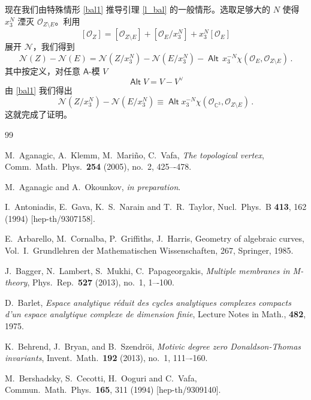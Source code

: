 \documentclass[12pt]{article}
\newcommand{\C}{\mathbb{C}}
\newcommand{\cO}{\mathscr{O}}
\newcommand{\cN}{\mathscr{N}}
\DeclareMathOperator{\Alt}{\textsf{Alt}}
\newcommand{\bA}{\mathsf{A}}
\theoremstyle{definition}
\begin{document}
现在我们由特殊情形 \eqref{bal1} 推导引理 \ref{l_bal} 的一般情形。选取足够大的 $N$ 使得 $x_3^N$ 湮灭 $\cO_{Z\setminus E}$。利用
$$
\left[\cO_{Z}\right] =
\left[\cO_{Z\setminus E}\right] +
\left[\cO_{E}/x_3^N\right] + x_3^N \left[\cO_{E}\right]
$$
展开 $\cN$，我们得到
\begin{equation}
\cN(Z) - \cN(E)  =
  \cN(Z/x_3^N) - \cN(E/x_3^N)
- \Alt \, x_3^{-N} \chi(\cO_E, \cO_{Z\setminus E} ) \,.
\end{equation}
其中按定义，对任意 $\bA$-模 $V$
$$
\Alt V = V - V^{\vee}
$$
由 \eqref{bal1} 我们得出
$$
\cN(Z/x_3^N) - \cN(E/x_3^N)  \equiv \Alt
 x_3^{-N} \chi(\cO_{\C^3}, \cO_{Z\setminus E}) \,.
$$
这就完成了证明。
\begin{thebibliography}{99}

M.~Aganagic, A.~Klemm, M.~Mari\~no, C.~Vafa, 
\emph{The topological vertex}, 
 Comm.\ Math.\ Phys.\ \textbf{254} (2005), no.~2, 425–-478.

M.~Aganagic and A.~Okounkov, 
\emph{in preparation}. 


  I.~Antoniadis, E.~Gava, K.~S.~Narain and T.~R.~Taylor,
  Nucl.\ Phys.\ B {\bf 413}, 162 (1994)
  [hep-th/9307158].
  
E.~Arbarello, M.~Cornalba, P.~Griffiths, J.~Harris, 
Geometry of algebraic curves, Vol.\ I.\ 
Grundlehren der Mathematischen Wissenschaften, 267, Springer, 1985. 

J.~Bagger, N.~Lambert, S.~Mukhi, C.~Papageorgakis, 
\emph{Multiple membranes in M-theory},
 Phys.\ Rep.\ \textbf{527} (2013), no.~1, 1–-100.

D.~Barlet, 
\emph{Espace analytique r\'eduit des cycles analytiques complexes
  compacts d'un espace analytique complexe de dimension finie}, 
Lecture Notes in Math., \textbf{482}, 1975.

K.~Behrend, J.~Bryan, and B.~Szendr\"oi, 
\emph{Motivic degree zero Donaldson-Thomas invariants},
 Invent.\ Math.\ \textbf{192} (2013), no.~1, 111–-160.

  M.~Bershadsky, S.~Cecotti, H.~Ooguri and C.~Vafa,
  Commun.\ Math.\ Phys.\  {\bf 165}, 311 (1994)
  [hep-th/9309140].
  

\end{thebibliography}
\end{document}
